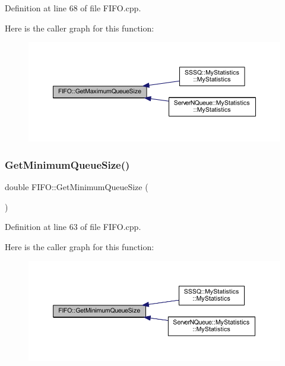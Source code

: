 Definition at line 68 of file F\+I\+F\+O.\+cpp.

Here is the caller graph for this function\+:
\nopagebreak
\begin{figure}[H]
\begin{center}
\leavevmode
\includegraphics[width=350pt]{class_f_i_f_o_a77a83086bafa4145487dd2918ed36aa4_icgraph}
\end{center}
\end{figure}
\mbox{\label{class_f_i_f_o_ad28e880c6365098995f45fc9f14121ef}} 
\subsubsection{\texorpdfstring{Get\+Minimum\+Queue\+Size()}{GetMinimumQueueSize()}}
{\footnotesize\ttfamily double F\+I\+F\+O\+::\+Get\+Minimum\+Queue\+Size (\begin{DoxyParamCaption}{ }\end{DoxyParamCaption})}



Definition at line 63 of file F\+I\+F\+O.\+cpp.

Here is the caller graph for this function\+:
\nopagebreak
\begin{figure}[H]
\begin{center}
\leavevmode
\includegraphics[width=350pt]{class_f_i_f_o_ad28e880c6365098995f45fc9f14121ef_icgraph}
\end{center}
\end{figure}
\mbox{\label{class_f_i_f_o_a67cb60ba28bfe8efd4aae30c303aa296}} 
